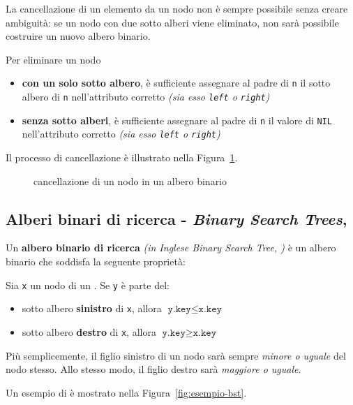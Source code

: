 \documentclass[italian, 10pt]{article}
\begin{document}
La cancellazione di un elemento da un nodo non è sempre possibile senza creare ambiguità: se un nodo con due sotto alberi viene eliminato, non sarà possibile costruire un nuovo albero binario.

Per eliminare un nodo

\begin{itemize}
  \item \textbf{con un solo sotto albero}, è sufficiente assegnare al padre di \texttt{n} il sotto albero di \texttt{n} nell'attributo corretto \textit{(sia esso \texttt{left} o \texttt{right})}
  \item \textbf{senza sotto alberi}, è sufficiente assegnare al padre di \texttt{n} il valore di \texttt{NIL} nell'attributo corretto \textit{(sia esso \texttt{left} o \texttt{right})}
\end{itemize}

\bigskip
Il processo di cancellazione è illustrato nella Figura~\ref{fig:cancellazione-albero-binario}.

\begin{figure}[htbp]
  \bigskip
  \centering
  \caption{cancellazione di un nodo in un albero binario}
  \label{fig:cancellazione-albero-binario}
  \bigskip
\end{figure}

\subsection{Alberi binari di ricerca - \textit{Binary Search Trees}, \BST}

Un \textbf{albero binario di ricerca} \textit{(in Inglese Binary Search Tree, \BST)} è un albero binario che soddisfa la seguente proprietà:

Sia \texttt{x} un nodo di un \BST.
Se \texttt{y} è parte del:

\begin{itemize}
  \item sotto albero \textbf{sinistro} di \texttt{x}, allora \(\texttt{y.key} \leq \texttt{x.key}\)
  \item sotto albero \textbf{destro} di \texttt{x}, allora \(\texttt{y.key} \geq \texttt{x.key}\)
\end{itemize}

Più semplicemente, il figlio sinistro di un nodo sarà sempre \textit{minore o uguale} del nodo stesso.
Allo stesso modo, il figlio destro sarà \textit{maggiore o uguale}.

\bigskip
Un esempio di \BST è mostrato nella Figura~\ref{fig:esempio-bst}.
\end{document}
